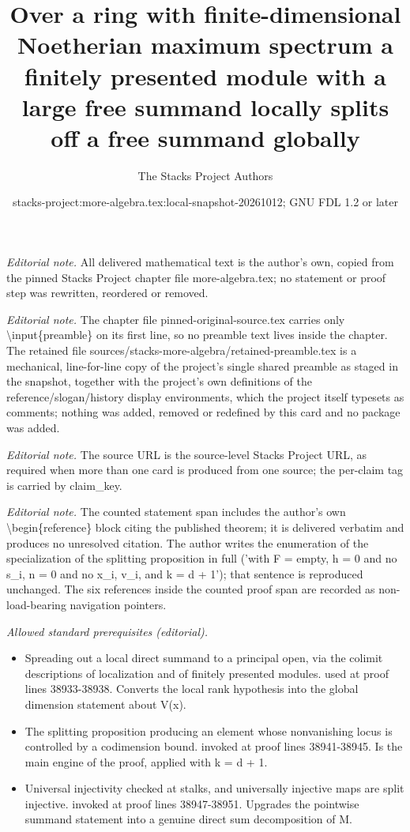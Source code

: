 \documentclass[10pt,a4paper]{amsart}
\title{Over a ring with finite-dimensional Noetherian maximum spectrum a finitely presented module with a large free summand locally splits off a free summand globally}
\author{The Stacks Project Authors}
\date{stacks-project:more-algebra.tex:local-snapshot-20261012; GNU FDL 1.2 or later}
\theoremstyle{plain}
\theoremstyle{definition}
\theoremstyle{remark}
\numberwithin{equation}{subsection}
\begin{document}
\maketitle
\setcounter{subsection}{1}
\noindent\textit{Editorial note.} All delivered mathematical text is the author's own, copied from the pinned Stacks Project chapter file more-algebra.tex; no statement or proof step was rewritten, reordered or removed.\par\medskip
\noindent\textit{Editorial note.} The chapter file pinned-original-source.tex carries only \textbackslash{}input\{preamble\} on its first line, so no preamble text lives inside the chapter. The retained file sources/stacks-more-algebra/retained-preamble.tex is a mechanical, line-for-line copy of the project's single shared preamble as staged in the snapshot, together with the project's own definitions of the reference/slogan/history display environments, which the project itself typesets as comments; nothing was added, removed or redefined by this card and no package was added.\par\medskip
\noindent\textit{Editorial note.} The source URL is the source-level Stacks Project URL, as required when more than one card is produced from one source; the per-claim tag is carried by claim\_key.\par\medskip
\noindent\textit{Editorial note.} The counted statement span includes the author's own \textbackslash{}begin\{reference\} block citing the published theorem; it is delivered verbatim and produces no unresolved citation. The author writes the enumeration of the specialization of the splitting proposition in full ('with F = empty, h = 0 and no s\_i, n = 0 and no x\_i, v\_i, and k = d + 1'); that sentence is reproduced unchanged. The six references inside the counted proof span are recorded as non-load-bearing navigation pointers.\par\medskip
\noindent\textit{Allowed standard prerequisites (editorial).}\begin{itemize}
\item Spreading out a local direct summand to a principal open, via the colimit descriptions of localization and of finitely presented modules. used at proof lines 38933-38938. Converts the local rank hypothesis into the global dimension statement about V(x).
\item The splitting proposition producing an element whose nonvanishing locus is controlled by a codimension bound. invoked at proof lines 38941-38945. Is the main engine of the proof, applied with k = d + 1.
\item Universal injectivity checked at stalks, and universally injective maps are split injective. invoked at proof lines 38947-38951. Upgrades the pointwise summand statement into a genuine direct sum decomposition of M.
\end{itemize}\medskip
\end{document}
